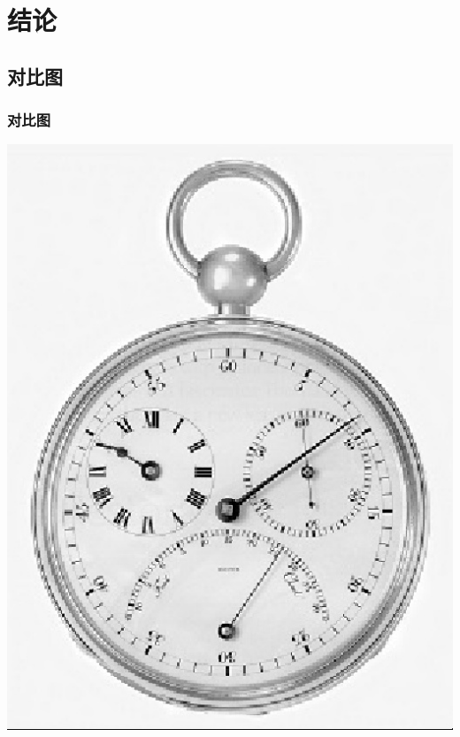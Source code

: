 \documentclass[notheorems,serif,table,compress]{beamer}  %
\begin{document}
\section{结论}

\subsection{对比图}

\begin{frame}
\frametitle{对比图}
	\begin{minipage}[t]{0.32\linewidth}
        \centering
        \includegraphics[width=0.9\linewidth]{nearest.jpg} 
        \end{minipage}
	\begin{minipage}[t]{0.32\linewidth}
        \centering

\end{minipage}
\end{frame}
\end{document}
